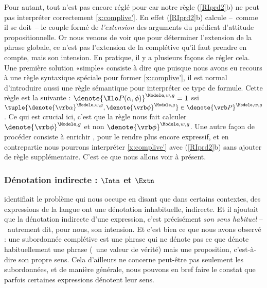 Pour autant, tout n'est pas encore réglé pour {\LO} car 
notre règle (\RSem\ref{RIprd2}b) ne peut pas interpréter correctement 
\ref{x:complive'}. 
En effet (\RSem\ref{RIprd2}b) calcule --~comme il se doit~-- le couple formé de \emph{l'extension} des arguments du prédicat d'attitude propositionnelle. Or nous venons de voir que pour déterminer l'extension de la phrase globale,  ce n'est pas l'extension de la complétive qu'il faut prendre en compte, mais son intension. En pratique, il y a plusieurs façons de régler cela. Une première solution «simple» consiste à dire que puisque nous avons eu recours à une règle syntaxique spéciale pour former \ref{x:complive'}, il est normal d'introduire aussi une règle sémantique  pour interpréter ce type de formule. 
Cette règle est la suivante : %
\(\denote{\Xlo P(\alpha,\phi)}^{\Modele,w,g}=1\) ssi 
\(\tuple{\denote{\vrb\alpha}^{\Modele,w,g},\denote{\vrb\phi}^{\Modele,g}}\in\denote{\vrb P}^{\Modele,w,g}\).
Ce qui est crucial ici, c'est que la règle nous fait calculer $\denote{\vrb\phi}^{\Modele,g}$ et non $\denote{\vrb\phi}^{\Modele,w,g}$.
Une autre façon de procéder consiste à enrichir {\LO}, pour le rendre plus encore expressif, et en contrepartie nous pourrons interpréter \ref{x:complive'} avec (\RSem\ref{RIprd2}b) sans ajouter de règle supplémentaire. C'est ce que nous allons voir à présent.


\subsubsection{Dénotation indirecte : {$\Intn$ et $\Extn$}}
\label{sss:^v}

\citet{Frege:SuB}
identifiait le problème qui nous occupe
en disant
que
dans certains contextes, des expressions de la
langue ont une dénotation inhabituelle, indirecte.
Et il ajoutait que la dénotation indirecte d'une expression, c'est précisément \emph{son sens habituel} --~autrement dit, pour nous, son intension.
Et c'est bien ce que nous avons observé  : une subordonnée complétive est une phrase qui ne dénote pas ce que dénote habituellement une phrase (\ie\ une valeur de vérité) mais  une proposition, c'est-à-dire son propre sens.
Cela d'ailleurs ne concerne peut-être pas seulement les subordonnées, et de manière générale, nous pouvons en bref faire le constat que parfois certaines expressions dénotent leur sens.

\largerpage

